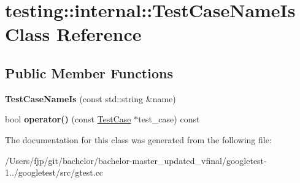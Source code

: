 \hypertarget{classtesting_1_1internal_1_1_test_case_name_is}{}\section{testing\+:\+:internal\+:\+:Test\+Case\+Name\+Is Class Reference}
\label{classtesting_1_1internal_1_1_test_case_name_is}
\subsection*{Public Member Functions}
\begin{DoxyCompactItemize}
\item 
\mbox{\label{classtesting_1_1internal_1_1_test_case_name_is_a7c983707f4cfe7f36dbabc95da5113c4}} 
{\bfseries Test\+Case\+Name\+Is} (const std\+::string \&name)
\item 
\mbox{\label{classtesting_1_1internal_1_1_test_case_name_is_aa96c4e9facbaa7043c8f0b34465d1eae}} 
bool {\bfseries operator()} (const \mbox{\hyperlink{classtesting_1_1_test_case}{Test\+Case}} $\ast$test\+\_\+case) const
\end{DoxyCompactItemize}


The documentation for this class was generated from the following file\+:\begin{DoxyCompactItemize}
\item 
/\+Users/fjp/git/bachelor/bachelor-\/master\+\_\+updated\+\_\+vfinal/googletest-\/1../googletest/src/gtest.\+cc\end{DoxyCompactItemize}
